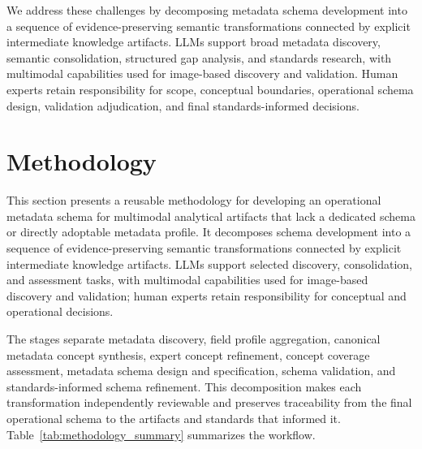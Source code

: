 \documentclass{article}
\begin{document}
We address these challenges by decomposing metadata schema development into a sequence of evidence-preserving semantic transformations connected by explicit intermediate knowledge artifacts. LLMs support broad metadata discovery, semantic consolidation, structured gap analysis, and standards research, with multimodal capabilities used for image-based discovery and validation. Human experts retain responsibility for scope, conceptual boundaries, operational schema design, validation adjudication, and final standards-informed decisions.

\section{Methodology}
\label{sec:methodology}

This section presents a reusable methodology for developing an operational metadata schema for multimodal analytical artifacts that lack a dedicated schema or directly adoptable metadata profile. It decomposes schema development into a sequence of evidence-preserving semantic transformations connected by explicit intermediate knowledge artifacts. LLMs support selected discovery, consolidation, and assessment tasks, with multimodal capabilities used for image-based discovery and validation; human experts retain responsibility for conceptual and operational decisions.

The stages separate metadata discovery, field profile aggregation, canonical metadata concept synthesis, expert concept refinement, concept coverage assessment, metadata schema design and specification, schema validation, and standards-informed schema refinement. This decomposition makes each transformation independently reviewable and preserves traceability from the final operational schema to the artifacts and standards that informed it. Table~\ref{tab:methodology_summary} summarizes the workflow.
\end{document}
